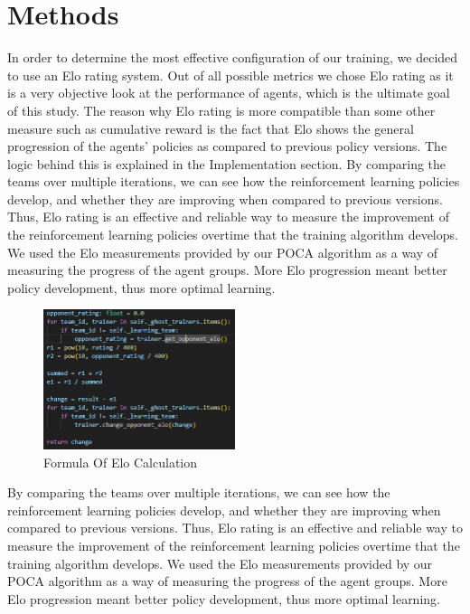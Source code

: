 \documentclass{LSkill}
\begin{document}
\section{Methods}
In order to determine the most effective configuration of our training, we decided to use an Elo rating system. Out of all possible metrics we chose Elo rating as it is a very objective look at the performance of agents, which is the ultimate goal of this study. 
The reason why Elo rating is more compatible than some other measure such as cumulative reward is the fact that Elo shows the general progression of the agents’ policies as compared to previous policy versions. The logic behind this is explained in the Implementation section. 
	By comparing the teams over multiple iterations, we can see how the reinforcement learning policies develop, and whether they are improving when compared to previous versions. Thus, Elo rating is an effective and reliable way to measure the improvement of the reinforcement learning policies overtime that the training algorithm develops. 
	We used the Elo measurements provided by our POCA algorithm as a way of measuring the progress of the agent groups. More Elo progression meant better policy development, thus more optimal learning.

\begin{figure}[htbp]
    \centering
    \includegraphics[width=0.5\textwidth]{figure 1.png} 
    \caption{Formula Of Elo Calculation}
    \label{fig:Formula Of Elo Calculation}
\end{figure}
By comparing the teams over multiple iterations, we can see how the reinforcement learning policies develop, and whether they are improving when compared to previous versions. Thus, Elo rating is an effective and reliable way to measure the improvement of the reinforcement learning policies overtime that the training algorithm develops. 
We used the Elo measurements provided by our POCA algorithm as a way of measuring the progress of the agent groups. More Elo progression meant better policy development, thus more optimal learning. 
\end{document}
